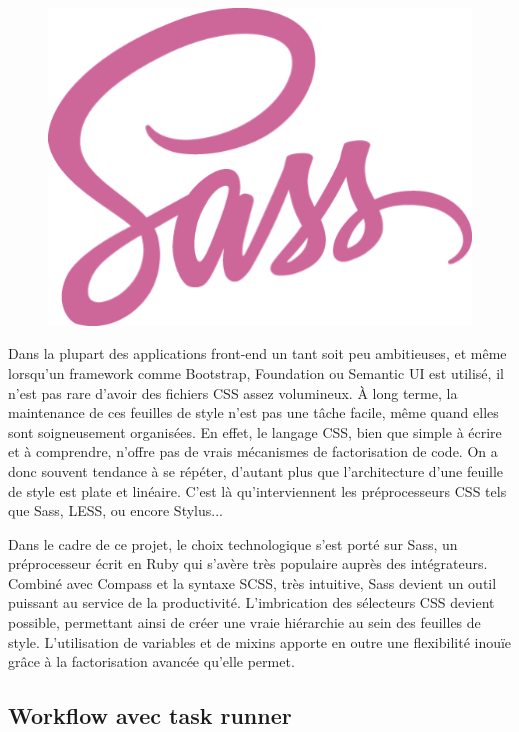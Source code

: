 \documentclass[a4paper,12pt]{article}
\begin{document}
\begin{figure}[!h]
  \begin{center}
    \includegraphics[scale=0.2]{logo-sass.png}
  \end{center}
\end{figure}

Dans la plupart des applications front-end un tant soit peu ambitieuses, et même lorsqu'un framework comme Bootstrap, Foundation ou Semantic UI est utilisé, il n'est pas rare d'avoir des fichiers CSS assez volumineux. À long terme, la maintenance de ces feuilles de style n'est pas une tâche facile, même quand elles sont soigneusement organisées. En effet, le langage CSS, bien que simple à écrire et à comprendre, n'offre pas de vrais mécanismes de factorisation de code. On a donc souvent tendance à se répéter, d'autant plus que l'architecture d'une feuille de style est plate et linéaire. C'est là qu'interviennent les préprocesseurs CSS tels que Sass, LESS, ou encore Stylus...

Dans le cadre de ce projet, le choix technologique s'est porté sur Sass, un préprocesseur écrit en Ruby qui s'avère très populaire auprès des intégrateurs. Combiné avec Compass et la syntaxe SCSS, très intuitive, Sass devient un outil puissant au service de la productivité. L'imbrication des sélecteurs CSS devient possible, permettant ainsi de créer une vraie hiérarchie au sein des feuilles de style. L'utilisation de variables et de mixins apporte en outre une flexibilité inouïe grâce à la factorisation avancée qu'elle permet.

\subsection{Workflow avec task runner}
\end{document}
